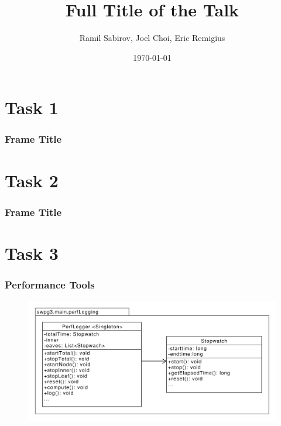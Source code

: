 \documentclass{beamer}
\title[Short title]{Full Title of the Talk} %
\author{Ramil Sabirov, Joel Choi, Eric Remigius} %
\institute[RWTH] %
{
RWTH Aachen \\ %
\medskip
\textit{Gruppe3} %
}
\date{\today} %
\begin{document}
\begin{frame}
\titlepage %
\end{frame}


\section{Task 1}

\begin{frame}
\frametitle{Frame Title}


\end{frame}

\section{Task 2}

\begin{frame}
\frametitle{Frame Title}


\end{frame}

\section{Task 3}

\begin{frame}
\frametitle{Performance Tools}

  \begin{figure}
    \centering
    \includegraphics[width=\textwidth]{figures/ClassDiagrammPerfLogging.pdf}
  \end{figure}

\end{frame}
\end{document}
